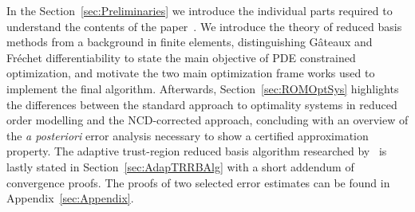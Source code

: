 In the Section~\ref{sec:Preliminaries} we introduce the individual parts required to understand the contents of the paper~\cite{Keil2021}.
We introduce the theory of reduced basis methods from a background in finite elements, distinguishing G\^{a}teaux and Fr\'{e}chet differentiability to state the main objective of PDE constrained optimization, and motivate the two main optimization frame works used to implement the final algorithm.
Afterwards, Section~\ref{sec:ROMOptSys} highlights the differences between the standard approach to optimality systems in reduced order modelling and the NCD-corrected approach, concluding with an overview of the \textit{a posteriori} error analysis necessary to show a certified approximation property.
The adaptive trust-region reduced basis algorithm researched by~\cite{Qian2017, Keil2021} is lastly stated in Section~\ref{sec:AdapTRRBAlg} with a short addendum of convergence proofs.
The proofs of two selected error estimates can be found in Appendix~\ref{sec:Appendix}.